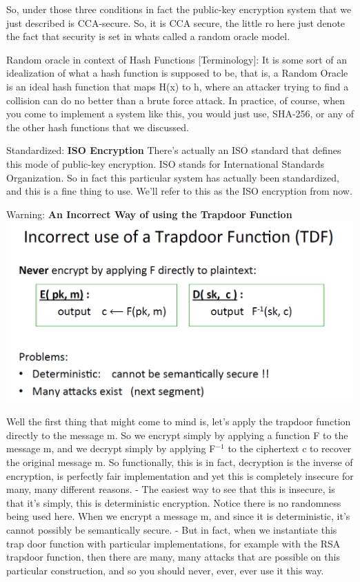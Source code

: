 \documentclass[11pt]{article}
\makeatletter
\def\maxwidth{\ifdim\Gin@nat@width>\linewidth\linewidth
    \else\Gin@nat@width\fi}
\let\Oldincludegraphics\includegraphics
\renewcommand{\includegraphics}[1]{\Oldincludegraphics[width=.8\maxwidth]{#1}}
\makeatother
\begin{document}
So, under those three conditions in fact the public-key encryption
system that we just described is CCA-secure. So, it is CCA secure, the
little ro here just denote the fact that security is set in whats called
a random oracle model.

Random oracle in context of Hash Functions {[}Terminology{]}: It is some
sort of an idealization of what a hash function is supposed to be, that
is, a Random Oracle is an ideal hash function that maps H(x) to h, where
an attacker trying to find a collision can do no better than a brute
force attack. In practice, of course, when you come to implement a
system like this, you would just use, SHA-256, or any of the other hash
functions that we discussed.

Standardized: \textbf{ISO Encryption} There's actually an ISO standard
that defines this mode of public-key encryption. ISO stands for
International Standards Organization. So in fact this particular system
has actually been standardized, and this is a fine thing to use. We'll
refer to this as the ISO encryption from now.

Warning: \textbf{An Incorrect Way of using the Trapdoor Function}
\includegraphics{./Images/IncorrectTDP.png}

Well the first thing that might come to mind is, let's apply the
trapdoor function directly to the message m. So we encrypt simply by
applying a function F to the message m, and we decrypt simply by
applying F\(^{-1}\) to the ciphertext c to recover the original message
m. So functionally, this is in fact, decryption is the inverse of
encryption, is perfectly fair implementation and yet this is completely
insecure for many, many different reasons. - The easiest way to see that
this is insecure, is that it's simply, this is deterministic encryption.
Notice there is no randomness being used here. When we encrypt a message
m, and since it is deterministic, it's cannot possibly be semantically
secure. - But in fact, when we instantiate this trap door function with
particular implementations, for example with the RSA trapdoor function,
then there are many, many attacks that are possible on this particular
construction, and so you should never, ever, ever use it this way.
\end{document}
